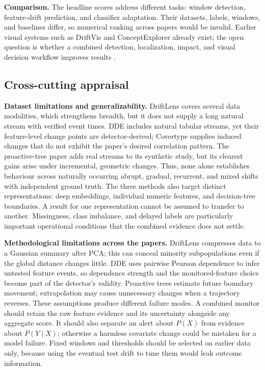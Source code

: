 \documentclass[10pt,a4paper]{article}
\begin{document}
\textbf{Comparison.} The headline scores address different tasks: window detection, feature-drift prediction, and classifier adaptation. Their datasets, labels, windows, and baselines differ, so numerical ranking across papers would be invalid. Earlier visual systems such as DriftVis and ConceptExplorer already exist; the open question is whether a combined detection, localization, impact, and visual decision workflow improves results \cite{driftvis,conceptexplorer}.

\subsection*{Cross-cutting appraisal}
\textbf{Dataset limitations and generalizability.} DriftLens covers several data modalities, which strengthens breadth, but it does not supply a long natural stream with verified event times. DDE includes natural tabular streams, yet their feature-level change points are detector-derived; Covertype supplies induced changes that do not exhibit the paper's desired correlation pattern. The proactive-tree paper adds real streams to its synthetic study, but its clearest gains arise under incremental, geometric changes. Thus, none alone establishes behaviour across naturally occurring abrupt, gradual, recurrent, and mixed shifts with independent ground truth. The three methods also target distinct representations: deep embeddings, individual numeric features, and decision-tree boundaries. A result for one representation cannot be assumed to transfer to another. Missingness, class imbalance, and delayed labels are particularly important operational conditions that the combined evidence does not settle.

\textbf{Methodological limitations across the papers.} DriftLens compresses data to a Gaussian summary after PCA; this can conceal minority subpopulations even if the global distance changes little. DDE uses pairwise Pearson dependence to infer untested feature events, so dependence strength and the monitored-feature choice become part of the detector's validity. Proactive trees estimate future boundary movement; extrapolation may cause unnecessary changes when a trajectory reverses. These assumptions produce different failure modes. A combined monitor should retain the raw feature evidence and its uncertainty alongside any aggregate score. It should also separate an alert about $P(X)$ from evidence about $P(Y\mid X)$; otherwise a harmless covariate change could be mistaken for a model failure. Fixed windows and thresholds should be selected on earlier data only, because using the eventual test drift to tune them would leak outcome information.
\end{document}

